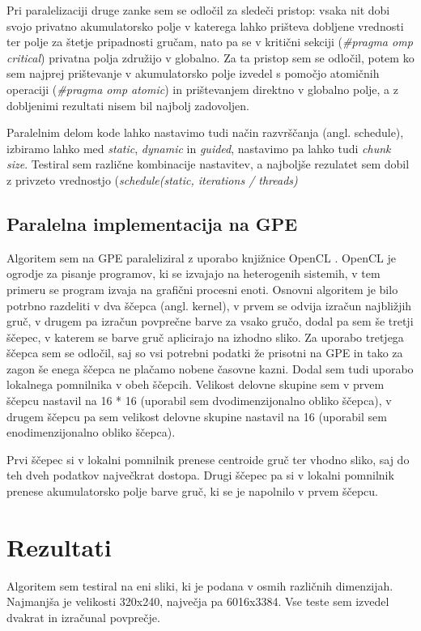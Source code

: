 \documentclass[11pt]{article}
\begin{document}
\bigskip\noindent
Pri paralelizaciji druge zanke sem se odločil za sledeči pristop:
vsaka nit dobi svojo privatno akumulatorsko polje v katerega lahko prišteva dobljene vrednosti ter polje za štetje pripadnosti gručam,
nato pa se v kritični sekciji (\emph{\#pragma omp critical}) privatna polja združijo v globalno.
Za ta pristop sem se odločil, potem ko sem najprej prištevanje v akumulatorsko polje izvedel s pomočjo atomičnih operaciji (\emph{\#pragma omp atomic}) in prištevanjem direktno v globalno polje,
a z dobljenimi rezultati nisem bil najbolj zadovoljen.

\bigskip\noindent
Paralelnim delom kode lahko nastavimo tudi način razvrščanja (angl. schedule), izbiramo lahko med \emph{static}, \emph{dynamic} in \emph{guided}, nastavimo pa lahko tudi \emph{chunk size}.
Testiral sem različne kombinacije nastavitev, a najboljše rezulatet sem dobil z privzeto vrednostjo (\emph{schedule(static, iterations / threads)}

\subsection{Paralelna implementacija na GPE}
Algoritem sem na GPE paraleliziral z uporabo knjižnice OpenCL \cite{OpenCL}. OpenCL je ogrodje za pisanje programov, ki se izvajajo na heterogenih sistemih, v tem primeru se program izvaja na grafični procesni enoti.
Osnovni algoritem je bilo potrbno razdeliti v dva ščepca (angl. kernel), v prvem se odvija izračun najbližjih gruč, v drugem pa izračun povprečne barve za vsako gručo, dodal pa sem še tretji ščepec, v katerem se barve gruč aplicirajo na izhodno sliko. Za uporabo tretjega ščepca sem se odločil,
saj so vsi potrebni podatki že prisotni na GPE in tako za zagon še enega ščepca ne plačamo nobene časovne kazni.
Dodal sem tudi uporabo lokalnega pomnilnika v obeh ščepcih. Velikost delovne skupine sem v prvem ščepcu nastavil na 16 * 16 (uporabil sem dvodimenzijonalno obliko ščepca), v drugem ščepcu pa sem velikost delovne skupine nastavil na 16 (uporabil sem enodimenzijonalno obliko ščepca).

\bigskip\noindent
Prvi ščepec si v lokalni pomnilnik prenese centroide gruč ter vhodno sliko, saj do teh dveh podatkov največkrat dostopa.
Drugi ščepec pa si v lokalni pomnilnik prenese akumulatorsko polje barve gruč, ki se je napolnilo v prvem ščepcu.


\section{Rezultati}
Algoritem sem testiral na eni sliki, ki je podana v osmih različnih dimenzijah. Najmanjša je velikosti 320x240, največja pa 6016x3384.
Vse teste sem izvedel dvakrat in izračunal povprečje.
\end{document}

